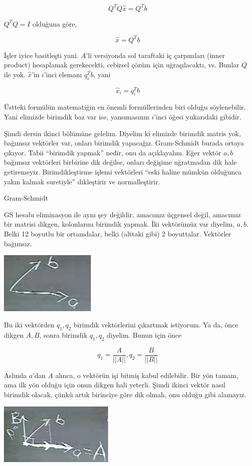 \documentclass[12pt,fleqn]{article}\usepackage{../../common}
\begin{document}
$$Q^TQ\hat{x} = Q^Tb$$

$Q^TQ = I$ olduğuna göre, 

$$\hat{x} = Q^Tb$$

İşler iyice basitleşti yani. $A$'li versiyonda sol taraftaki iç çarpımları
(inner product) hesaplamak gerekecekti, cebirsel çözüm için uğraşılacaktı,
vs. Bunlar $Q$ ile yok. $\hat{x}$'in $i$'inci elemanı $q_i^Tb$, yani 

$$\hat{x}_i = q_i^Tb$$

Üstteki formülün matematiğin en önemli formüllerinden biri olduğu
söylenebilir. Yani elimizde birimdik baz var ise, yansımasının $i$'inci
öğesi yukarıdaki gibidir. 

Şimdi dersin ikinci bölümüne gelelim. Diyelim ki elimizde birimdik matris
yok, bağımsız vektörler var, onları birimdik yapacağız. Gram-Schmidt
burada ortaya çıkıyor. Tabii ``birimdik yapmak'' nedir, onu da
açıklayalım. Eğer vektör $a,b$ bağımsız vektörleri birbirine dik değilse,
onları değişime uğratmadan dik hale getiremeyiz. Birimdikleştirme işlemi
vektörleri ``eski haline mümkün olduğunca yakın kalmak suretiyle''
dikleştirir ve normalleştirir. 

Gram-Schmidt

GS hesabı eliminasyon ile aynı şey değildir, amacımız üçgensel değil,
amacımız bir matrisi dikgen, kolonlarını birimdik yapmak. İki
vektörümüz var diyelim, $a,b$. Belki 12 boyutlu bir ortamdalar, belki
(alttaki gibi) 2 boyuttalar. Vektörler bağımsız. 

\includegraphics[height=3cm]{17_1.png}

Bu iki vektörden $q_1,q_2$ birimdik vektörlerini çıkartmak istiyorum. Ya
da, önce dikgen $A,B$, sonra birimdik $q_1,q_2$ diyelim. Bunun için önce

$$q_1 = \frac{ A}{||A||}, q_2 = \frac{ B}{||B||} $$

Aslında $a$'dan $A$ alınca, o vektörün işi bitmiş kabul edilebilir. Bir yön
tamam, ama ilk yön olduğu için onun dikgen hali yeterli. Şimdi ikinci
vektör nasıl birimdik olacak, çünkü artık birinciye göre dik olmalı, onu
olduğu gibi alamayız. 

\includegraphics[height=3cm]{17_2.png}
\end{document}
